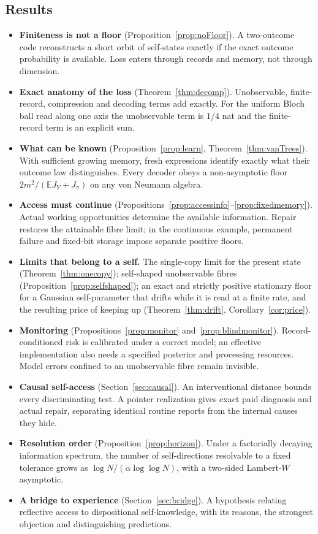 \documentclass[12pt]{article}
\theoremstyle{definition}
\theoremstyle{remark}
\newcommand{\E}{\mathbb E}
\begin{document}
\subsection{Results}

\begin{itemize}[itemsep=2pt]
\item \textbf{Finiteness is not a floor} (Proposition~\ref{prop:noFloor}). A two-outcome code reconstructs a short orbit of self-states exactly if the exact outcome probability is available. Loss enters through records and memory, not through dimension.
\item \textbf{Exact anatomy of the loss} (Theorem~\ref{thm:decomp}). Unobservable, finite-record, compression and decoding terms add exactly. For the uniform Bloch ball read along one axis the unobservable term is $1/4$ nat and the finite-record term is an explicit sum.
\item \textbf{What can be known} (Proposition~\ref{prop:learn}, Theorem~\ref{thm:vanTrees}). With sufficient growing memory, fresh expressions identify exactly what their outcome law distinguishes. Every decoder obeys a non-asymptotic floor $2m^2/(\E J_Y+J_\pi)$ on any von Neumann algebra.
\item \textbf{Access must continue} (Propositions~\ref{prop:accessinfo}--\ref{prop:fixedmemory}). Actual working opportunities determine the available information. Repair restores the attainable fibre limit; in the continuous example, permanent failure and fixed-bit storage impose separate positive floors.
\item \textbf{Limits that belong to a self.} The single-copy limit for the present state (Theorem~\ref{thm:onecopy}); self-shaped unobservable fibres (Proposition~\ref{prop:selfshaped}); an exact and strictly positive stationary floor for a Gaussian self-parameter that drifts while it is read at a finite rate, and the resulting price of keeping up (Theorem~\ref{thm:drift}, Corollary~\ref{cor:price}).
\item \textbf{Monitoring} (Propositions~\ref{prop:monitor} and~\ref{prop:blindmonitor}). Record-conditioned risk is calibrated under a correct model; an effective implementation also needs a specified posterior and processing resources. Model errors confined to an unobservable fibre remain invisible.
\item \textbf{Causal self-access} (Section~\ref{sec:causal}). An interventional distance bounds every discriminating test. A pointer realization gives exact paid diagnosis and actual repair, separating identical routine reports from the internal causes they hide.
\item \textbf{Resolution order} (Proposition~\ref{prop:horizon}). Under a factorially decaying information spectrum, the number of self-directions resolvable to a fixed tolerance grows as $\log N/(\alpha\log\log N)$, with a two-sided Lambert-$W$ asymptotic.
\item \textbf{A bridge to experience} (Section~\ref{sec:bridge}). A hypothesis relating reflective access to dispositional self-knowledge, with its reasons, the strongest objection and distinguishing predictions.
\end{itemize}
\end{document}
